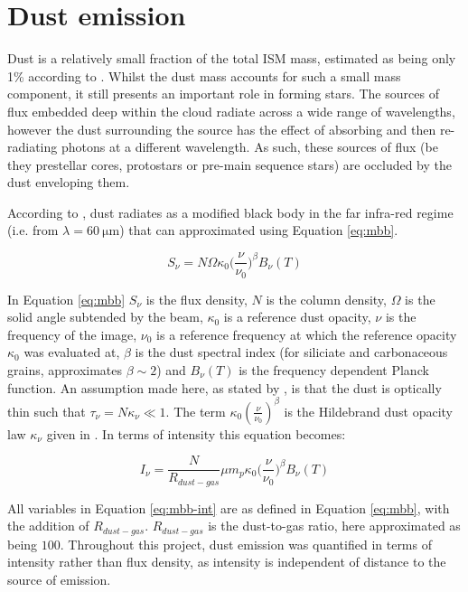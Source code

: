 \documentclass{report}
\begin{document}
\section{Dust emission}
Dust is a relatively small fraction of the total ISM mass, estimated as being only 1\% according to \textcite{noise}. Whilst the dust mass accounts for such a small mass component, it still presents an important role in forming stars. The sources of flux embedded deep within the cloud radiate across a wide range of wavelengths, however the dust surrounding the source has the effect of absorbing and then re-radiating photons at a different wavelength. As such, these sources of flux (be they prestellar cores, protostars or pre-main sequence stars) are occluded by the dust enveloping them.

According to \textcite{hildebrand}, dust radiates as a modified black body in the far infra-red regime (i.e. from $\lambda=\SI{60}{\micro\meter}$) that can approximated using Equation \ref{eq:mbb}.

\begin{equation} \label{eq:mbb}
  S_{\nu} = N \Omega \kappa_{0} \Big(\frac{\nu}{\nu_{0}}\Big)^{\beta} B_{\nu}(T)
\end{equation}

In Equation \ref{eq:mbb} $S_{\nu}$ is the flux density, $N$ is the column density, $\Omega$ is the solid angle subtended by the beam, $\kappa_{0}$ is a reference dust opacity, $\nu$ is the frequency of the image, $\nu_{0}$ is a reference frequency at which the reference opacity $\kappa_{0}$ was evaluated at, $\beta$ is the dust spectral index (for siliciate and carbonaceous grains, \textcite{beta} approximates $\beta \sim 2$) and $B_{\nu}(T)$ is the frequency dependent Planck function. An assumption made here, as stated by \textcite{kelly}, is that the dust is optically thin such that
$\tau_{\nu} = N\kappa_{\nu} \ll 1$. The term $\kappa_{0}(\frac{\nu}{\nu_{0}})^{\beta}$ is the Hildebrand dust opacity law $\kappa_{\nu}$ given in \textcite{dustopacity}. In terms of intensity this equation becomes:

\begin{equation} \label{eq:mbb-int}
  I_{\nu} = \frac{N}{R_{dust-gas}} \mu m_{p} \kappa_{0} \Big(\frac{\nu}{\nu_{0}}\Big)^{\beta} B_{\nu}(T)
\end{equation}

All variables in Equation \ref{eq:mbb-int} are as defined in Equation \ref{eq:mbb}, with the addition of $R_{dust-gas}$. $R_{dust-gas}$ is the dust-to-gas ratio, here approximated as being $100$. Throughout this project, dust emission was quantified in terms of intensity rather than flux density, as intensity is independent of distance to the source of emission.
\end{document}
